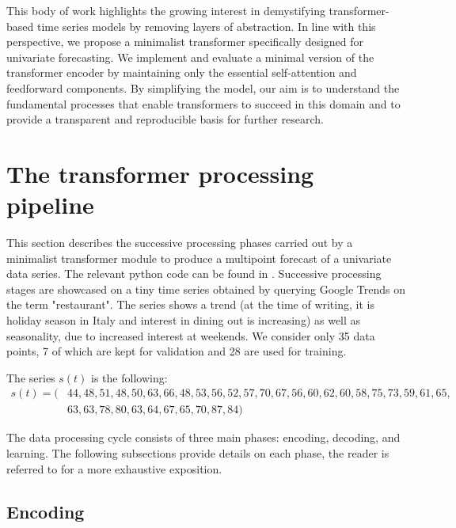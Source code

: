 \documentclass[algorithms,article,submit,pdftex,moreauthors]{Definitions/mdpi}
\begin{document}
This body of work highlights the growing interest in demystifying transformer-based time series models by removing layers of abstraction. In line with this perspective, we propose a minimalist transformer specifically designed for univariate forecasting. We implement and evaluate a minimal version of the transformer encoder by maintaining only the essential self-attention and feedforward components. By simplifying the model, our aim is to understand the fundamental processes that enable transformers to succeed in this domain and to provide a transparent and reproducible basis for further research.


\section{The transformer processing pipeline} \label{sec:transformer}

This section describes the successive processing phases carried out by a minimalist transformer module to produce a multipoint forecast of a univariate data series. The relevant python code can be found in \cite{G25}. Successive processing stages are showcased on a tiny time series obtained by querying Google Trends \cite{googletrends2025} on the term "restaurant". The series shows a trend (at the time of writing, it is holiday season in Italy and interest in dining out is increasing) as well as seasonality, due to increased interest at weekends. We consider only 35 data points, 7 of which are kept for validation and 28 are used for training.

The series $s(t)$ is the following:
\begin{align}
s(t) = (& 44, 48, 51, 48, 50, 63, 66, 48, 53, 56, 52, 57, 70, 67, 56, 60, 62, 60, 58, 75, 73, 59, 61, 65,\nonumber\\
        & 63, 63, 78, 80, 63, 64, 67, 65, 70, 87, 84)\nonumber
\end{align}

The data processing cycle consists of three main phases: encoding, decoding, and learning. The following subsections provide details on each phase, the reader is referred to \cite{VSPU17} for a more exhaustive exposition.

\subsection{Encoding} \label{subsec:encoding}
\end{document}
